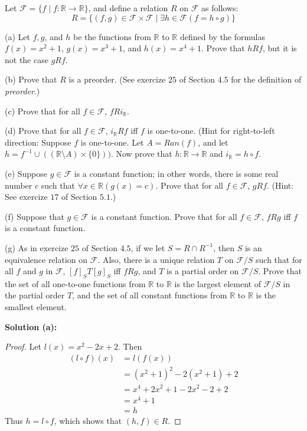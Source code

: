 \newpage
\begin{tcolorbox}[title=Problem 22, breakable]
    Let $\mathcal{F} = \{f \mid f : \mathbb{R} \rightarrow \mathbb{R}\}$,
        and define a relation $R$ on $\mathcal{F}$ as follows:
    \[R = \{(f, g) \in \mathcal{F} \times \mathcal{F} \mid \exists{h} \in \mathcal{F}(f = h \circ g)\}\]

    (a) Let $f, g$, and $h$ be the functions from $\mathbb{R}$ to $\mathbb{R}$ defined by the 
        formulas $f(x) = x^2 + 1$, $g(x) = x^3 + 1$, and $h(x) = x^4 + 1$. Prove that $hRf$,
        but it is not the case $gRf$.

    (b) Prove that $R$ is a preorder. (See exercize $25$ of Section $4.5$ for the
        definition of \emph{preorder}.)

    (c) Prove that for all $f \in \mathcal{F}$, $f R i_{\mathbb{R}}$.

    (d) Prove that for all $f \in \mathcal{F}$, $i_{\mathbb{R}} R f$ iff $f$ is one-to-one.
        (Hint for right-to-left direction: Suppose $f$ is one-to-one. Let $A = Ran(f)$, and 
         let $h = f^{-1} \cup ((\mathbb{R} \setminus A) \times \{0\}))$. Now prove that 
         $h : \mathbb{R} \rightarrow \mathbb{R}$ and $i_{\mathbb{R}} = h \circ f$.

    (e) Suppose $g \in \mathcal{F}$ is a constant function; in other words, there is some 
        real number $c$ such that $\forall{x} \in \mathbb{R}(g(x) = c)$. Prove that for all 
        $f \in \mathcal{F}$, $g R f$. (Hint: See exercize $17$ of Section $5.1$.)

    (f) Suppose that $g \in \mathcal{F}$ is a constant function.
        Prove that for all $f \in \mathcal{F}$, $f R g$ iff $f$ is a constant function.

    (g) As in exercize $25$ of Section $4.5$, if we let $S = R \cap R^{-1}$, then $S$ 
        is an equivalence relation on $\mathcal{F}$. Also, there is a unique relation 
        $T$ on $\mathcal{F} / S$ such that for all $f$ and $g$ in $\mathcal{F}$,
        $[f]_S T [g]_S$ iff $f R g$, and $T$ is a partial order on $\mathcal{F} / S$.
        Prove that the set of all one-to-one functions from $\mathbb{R}$ to $\mathbb{R}$
        is the largest element of $\mathcal{F} / S$ in the partial order $T$, and the set 
        of all constant functions from $\mathbb{R}$ to $\mathbb{R}$ is the smallest element.
\end{tcolorbox}

\textbf{Solution (a):}

\begin{proof}
    Let $l(x) = x^2 - 2x + 2$. Then 
    \begin{align*}
    (l \circ f)(x) 
        &= l(f(x)) \\
        &= (x^2 + 1)^2 - 2(x^2 + 1) + 2 \\
        &= x^4 + 2x^2 + 1 - 2x^2 - 2 + 2 \\
        &= x^4 + 1 \\
        &= h
    \end{align*}
    Thus $h = l \circ f$, which shows that $(h, f) \in R$.
\end{proof}

